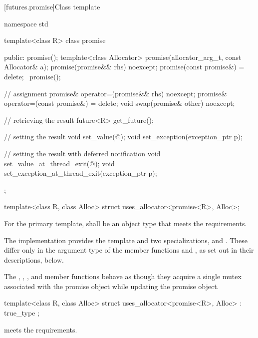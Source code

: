 [futures.promise]{Class template }

%
\begin{codeblock}
namespace std {
  template<class R>
  class promise {
  public:
    promise();
    template<class Allocator>
      promise(allocator_arg_t, const Allocator& a);
    promise(promise&& rhs) noexcept;
    promise(const promise&) = delete;
    ~promise();

    // assignment
    promise& operator=(promise&& rhs) noexcept;
    promise& operator=(const promise&) = delete;
    void swap(promise& other) noexcept;

    // retrieving the result
    future<R> get_future();

    // setting the result
    void set_value(@\seebelow@);
    void set_exception(exception_ptr p);

    // setting the result with deferred notification
    void set_value_at_thread_exit(@\seebelow@);
    void set_exception_at_thread_exit(exception_ptr p);
  };

  template<class R, class Alloc>
    struct uses_allocator<promise<R>, Alloc>;
}
\end{codeblock}

\pnum
For the primary template,  shall be an object type that
meets the  requirements.

\pnum
The implementation provides the template  and two specializations,
 and . These differ only in the argument type
of the member functions  and ,
as set out in their descriptions, below.

\pnum
The , , ,
and  member functions behave as though
they acquire a single mutex associated with the promise object while updating the
promise object.

%
\begin{itemdecl}
template<class R, class Alloc>
  struct uses_allocator<promise<R>, Alloc>
    : true_type { };
\end{itemdecl}

\begin{itemdescr}
\pnum
\expects
{} meets
the  requirements.
\end{itemdescr}

